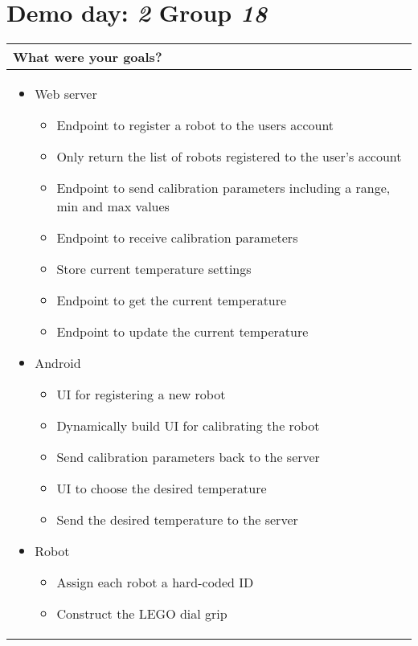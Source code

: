 \documentclass[a4paper]{article}
\newcommand{\colWidth}{141mm}
\begin{document}
 
\section*{Demo day: \textit{2} Group \textit{18}}


\begin{center}
\begin{tabular}{|p{\colWidth}|}
	\hline
	\cellcolor{blue!25}\large
	\textbf{What were your goals?}
	\\ \hline

	\begin{itemize}
		\item Web server
			\begin{itemize}
				\item Endpoint to register a robot to the users account
				\item Only return the list of robots registered to the user's account
				\item Endpoint to send calibration parameters including a range, min and max values
				\item Endpoint to receive calibration parameters
				\item Store current temperature settings
				\item Endpoint to get the current temperature
				\item Endpoint to update the current temperature
			\end{itemize}
		\item Android
			\begin{itemize}
				\item UI for registering a new robot
				\item Dynamically build UI for calibrating the robot
				\item Send calibration parameters back to the server
				\item UI to choose the desired temperature
				\item Send the desired temperature to the server
			\end{itemize}
		\item Robot
			\begin{itemize}
				\item Assign each robot a hard-coded ID
				\item Construct the LEGO dial grip
			\end{itemize}
	\end{itemize} \\


\end{tabular}
\end{center}
\end{document}
